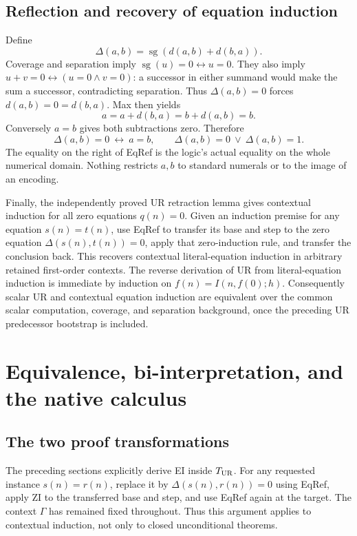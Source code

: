 \documentclass[11pt]{article}
\theoremstyle{definition}\newtheorem{definition}[theorem]{Definition}
\begin{document}
\subsection{Reflection and recovery of equation induction}

Define
\[
                       \Delta(a,b)=\operatorname{sg}(d(a,b)+d(b,a)).
\]
Coverage and separation imply $\operatorname{sg}(u)=0\leftrightarrow u=0$.
They also imply $u+v=0\leftrightarrow(u=0\land v=0)$: a successor
in either summand would make the sum a successor, contradicting separation.
Thus $\Delta(a,b)=0$ forces $d(a,b)=0=d(b,a)$. Max then yields
\[
               a=a+d(b,a)=b+d(a,b)=b.
\]
Conversely $a=b$ gives both subtractions zero. Therefore
\[
 \boxed{\quad \Delta(a,b)=0\ \longleftrightarrow\ a=b,\qquad
                  \Delta(a,b)=0\ \lor\ \Delta(a,b)=1.\quad}
 \tag{EqRef}
\]
The equality on the right of EqRef is the logic's actual equality on
the whole numerical domain. Nothing restricts $a,b$ to standard numerals
or to the image of an encoding.

Finally, the independently proved UR retraction lemma gives contextual
induction for all zero equations $q(n)=0$. Given an induction premise
for any equation $s(n)=t(n)$, use EqRef to transfer its base and step
to the zero equation $\Delta(s(n),t(n))=0$, apply that zero-induction
rule, and transfer the conclusion back. This recovers contextual
literal-equation induction in arbitrary retained first-order contexts.
The reverse derivation of UR from literal-equation induction is immediate
by induction on $f(n)=I(n,f(0);h)$. Consequently scalar UR and contextual
equation induction are equivalent over the common scalar computation,
coverage, and separation background, once the preceding UR predecessor
bootstrap is included.


\section{Equivalence, bi-interpretation, and the native calculus}
\label{sec:ur-equivalence-finish}

\subsection{The two proof transformations}
The preceding sections explicitly derive EI inside $T_{\rm UR}$.
For any requested instance $s(n)=r(n)$, replace it by
$\Delta(s(n),r(n))=0$ using EqRef, apply ZI to the transferred base
and step, and use EqRef again at the target.  The context $\Gamma$
has remained fixed throughout.  Thus this argument applies to
contextual induction, not only to closed unconditional theorems.
\end{document}
